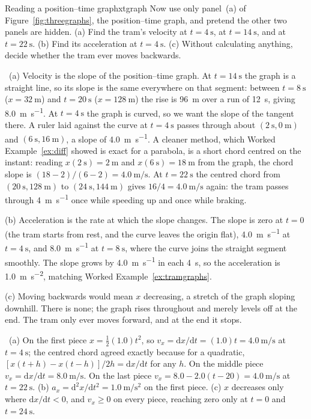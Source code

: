 \documentclass[11pt,twoside,openany]{book}
\newcommand{\dd}{\mathrm{d}}
\newcommand{\viewtag}[3]{\fcolorbox{#2}{#3}{\footnotesize\textbf{\textcolor{#2}{#1}}}}
\newcommand{\elemtag}{\viewtag{Elementary}{elemcol}{elempale}}
\newcommand{\calctag}{\viewtag{Calculus}{calccol}{calcpale}}
\newcommand{\elem}{\par\medskip\noindent\elemtag\ }
\newcommand{\calc}{\par\medskip\noindent\calctag\ }
\begin{document}
\begin{example}{Reading a position--time graph}{xtgraph}
Now use only panel~(a) of Figure~\ref{fig:threegraphs}, the position--time graph, and pretend the other two panels are hidden. (a) Find the tram's velocity at $t = \SI{4}{\second}$, at $t = \SI{14}{\second}$, and at $t = \SI{22}{\second}$. (b) Find its acceleration at $t = \SI{4}{\second}$. (c) Without calculating anything, decide whether the tram ever moves backwards.

\elem (a) Velocity is the slope of the position--time graph. At $t = \SI{14}{\second}$ the graph is a straight line, so its slope is the same everywhere on that segment: between $t = \SI{8}{\second}$ ($x = \SI{32}{\metre}$) and $t = \SI{20}{\second}$ ($x = \SI{128}{\metre}$) the rise is \SI{96}{\metre} over a run of \SI{12}{\second}, giving \SI{8.0}{\metre\per\second}. At $t = \SI{4}{\second}$ the graph is curved, so we want the slope of the tangent there. A ruler laid against the curve at $t = \SI{4}{\second}$ passes through about $(\SI{2}{\second}, \SI{0}{\metre})$ and $(\SI{6}{\second}, \SI{16}{\metre})$, a slope of \SI{4.0}{\metre\per\second}. A cleaner method, which Worked Example~\ref{ex:diff} showed is exact for a parabola, is a short chord centred on the instant: reading $x(\SI{2}{\second}) = \SI{2}{\metre}$ and $x(\SI{6}{\second}) = \SI{18}{\metre}$ from the graph, the chord slope is $(18 - 2)/(6 - 2) = \SI{4.0}{\metre\per\second}$. At $t = \SI{22}{\second}$ the centred chord from $(\SI{20}{\second}, \SI{128}{\metre})$ to $(\SI{24}{\second}, \SI{144}{\metre})$ gives $16/4 = \SI{4.0}{\metre\per\second}$ again: the tram passes through \SI{4}{\metre\per\second} once while speeding up and once while braking.

(b) Acceleration is the rate at which the slope changes. The slope is zero at $t = 0$ (the tram starts from rest, and the curve leaves the origin flat), \SI{4.0}{\metre\per\second} at $t = \SI{4}{\second}$, and \SI{8.0}{\metre\per\second} at $t = \SI{8}{\second}$, where the curve joins the straight segment smoothly. The slope grows by \SI{4.0}{\metre\per\second} in each \SI{4}{\second}, so the acceleration is \SI{1.0}{\metre\per\second\squared}, matching Worked Example~\ref{ex:tramgraphs}.

(c) Moving backwards would mean $x$ decreasing, a stretch of the graph sloping downhill. There is none; the graph rises throughout and merely levels off at the end. The tram only ever moves forward, and at the end it stops.

\calc (a) On the first piece $x = \tfrac12(1.0)t^2$, so $v_x = \dd x/\dd t = (1.0)t = \SI{4.0}{\metre\per\second}$ at $t = \SI{4}{\second}$; the centred chord agreed exactly because for a quadratic, $[x(t+h) - x(t-h)]/2h = \dd x/\dd t$ for any $h$. On the middle piece $v_x = \dd x/\dd t = \SI{8.0}{\metre\per\second}$. On the last piece $v_x = 8.0 - 2.0(t - 20) = \SI{4.0}{\metre\per\second}$ at $t = \SI{22}{\second}$. (b) $a_x = \dd^2 x/\dd t^2 = \SI{1.0}{\metre\per\second\squared}$ on the first piece. (c) $x$ decreases only where $\dd x/\dd t < 0$, and $v_x \ge 0$ on every piece, reaching zero only at $t = 0$ and $t = \SI{24}{\second}$.


\end{example}
\end{document}
